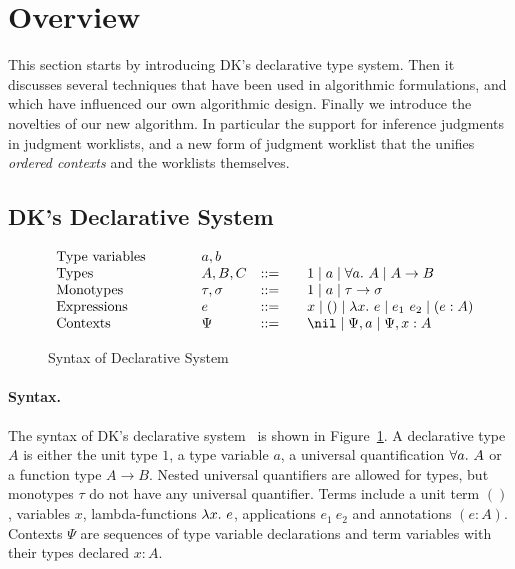 \section{Overview}

This section starts by introducing DK's declarative type system. Then
it discusses several techniques that have been used in algorithmic
formulations, and which have influenced our own algorithmic design.
Finally we introduce the novelties of our new algorithm.
In particular the support for inference judgments in
judgment worklists, and a new form of judgment worklist
that the unifies \emph{ordered contexts} and the worklists themselves. 

\subsection{DK's Declarative System}

\begin{figure}[t]
\[
\begin{array}{l@{\qquad}lcl}
\text{Type variables}\qquad&a, b
\\
\text{Types}\qquad&A, B, C &::=&\quad 1 \mid a \mid \all A \mid A\to B\\
\text{Monotypes}\qquad&\tau,\sigma &::=&\quad 1 \mid a \mid \tau\to \sigma
\\
\text{Expressions}\qquad&e &::=&\quad x \mid () \mid \lam e \mid e_1~e_2 \mid (e:A)
\\
\text{Contexts}\qquad&\Psi &::=&\quad \nil \mid \Psi, a \mid \Psi, x:A
\end{array}
\]
\caption{Syntax of Declarative System}\label{fig:decl:syntax}
\end{figure}

\paragraph{Syntax.}
The syntax of DK's declarative system~\cite{dunfield2013complete} is shown in Figure~\ref{fig:decl:syntax}.
A declarative type $A$ is either the unit type $1$, a type variable $a$,
a universal quantification $\all A$ or a function type $A \to B$.
Nested universal quantifiers are allowed for types,
but monotypes $\tau$ do not have any universal quantifier.
Terms include a unit term $()$, variables $x$, lambda-functions $\lam e$,
applications $e_1~e_2$ and annotations $(e:A)$.
Contexts $\Psi$ are sequences of type variable declarations and
term variables with their types declared $x:A$.

